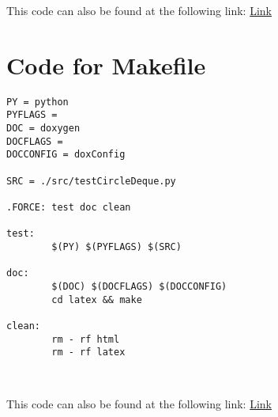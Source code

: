 \documentclass[12pt]{article}
\begin{document}
\noindent This code can also be found at the following link:
\href{https://gitlab.cas.mcmaster.ca/se2aa4_cs2me3_assignments/patelm16/blob/master/A2/src/testCircleDeque.py}{Link}

\newpage

\section{Code for Makefile} \label{MyMakefileSect}
\begin{lstlisting}
PY = python
PYFLAGS =
DOC = doxygen
DOCFLAGS =
DOCCONFIG = doxConfig

SRC = ./src/testCircleDeque.py

.FORCE: test doc clean

test:
        $(PY) $(PYFLAGS) $(SRC)

doc:
        $(DOC) $(DOCFLAGS) $(DOCCONFIG)
        cd latex && make

clean:
        rm - rf html
        rm - rf latex
\end{lstlisting}

~\newline

\noindent This code can also be found at the following link:
\href{https://gitlab.cas.mcmaster.ca/se2aa4_cs2me3_assignments/patelm16/blob/master/A2/Makefile}{Link}

\newpage
\end{document}
